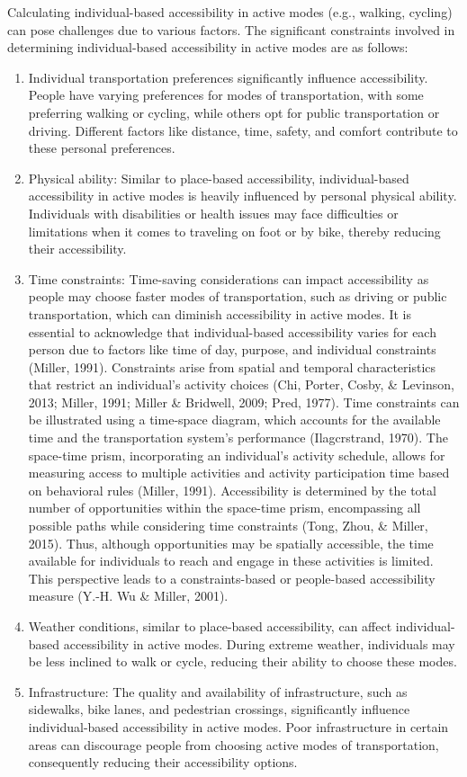 \documentclass[12pt,twoside]{reedthesis}
\begin{document}
Calculating individual-based accessibility in active modes (e.g., walking, cycling) can pose challenges due to various factors. The significant constraints involved in determining individual-based accessibility in active modes are as follows:
\begin{enumerate}
\def\labelenumi{\arabic{enumi}.}
\item
  Individual transportation preferences significantly influence accessibility. People have varying preferences for modes of transportation, with some preferring walking or cycling, while others opt for public transportation or driving. Different factors like distance, time, safety, and comfort contribute to these personal preferences.
\item
  Physical ability: Similar to place-based accessibility, individual-based accessibility in active modes is heavily influenced by personal physical ability. Individuals with disabilities or health issues may face difficulties or limitations when it comes to traveling on foot or by bike, thereby reducing their accessibility.
\item
  Time constraints: Time-saving considerations can impact accessibility as people may choose faster modes of transportation, such as driving or public transportation, which can diminish accessibility in active modes. It is essential to acknowledge that individual-based accessibility varies for each person due to factors like time of day, purpose, and individual constraints (Miller, 1991). Constraints arise from spatial and temporal characteristics that restrict an individual's activity choices (Chi, Porter, Cosby, \& Levinson, 2013; Miller, 1991; Miller \& Bridwell, 2009; Pred, 1977). Time constraints can be illustrated using a time-space diagram, which accounts for the available time and the transportation system's performance (Ilagcrstrand, 1970). The space-time prism, incorporating an individual's activity schedule, allows for measuring access to multiple activities and activity participation time based on behavioral rules (Miller, 1991). Accessibility is determined by the total number of opportunities within the space-time prism, encompassing all possible paths while considering time constraints (Tong, Zhou, \& Miller, 2015). Thus, although opportunities may be spatially accessible, the time available for individuals to reach and engage in these activities is limited. This perspective leads to a constraints-based or people-based accessibility measure (Y.-H. Wu \& Miller, 2001).
\item
  Weather conditions, similar to place-based accessibility, can affect individual-based accessibility in active modes. During extreme weather, individuals may be less inclined to walk or cycle, reducing their ability to choose these modes.
\item
  Infrastructure: The quality and availability of infrastructure, such as sidewalks, bike lanes, and pedestrian crossings, significantly influence individual-based accessibility in active modes. Poor infrastructure in certain areas can discourage people from choosing active modes of transportation, consequently reducing their accessibility options.
\end{enumerate}
\end{document}
